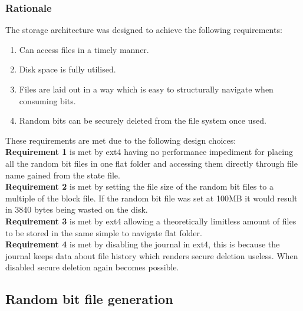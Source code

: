 \documentclass{paper}
\begin{document}
				\subsubsection{Rationale}
					The storage architecture was designed to achieve the following requirements: \vspace{-0.75em}
					\begin{enumerate}
					\setlength\itemsep{-0.3em}
					\item 	Can access files in a timely manner.
					\item 	Disk space is fully utilised.
					\item 	Files are laid out in a way which is easy to structurally navigate when consuming bits.
					\item 	Random bits can be securely deleted from the file system once used.
					\end{enumerate}
					These requirements are met due to the following design choices:\\
					\textbf{Requirement 1} is met by ext4 having no performance impediment for placing all the random bit files in one flat folder and accessing them directly through file name gained from the state file.\\
					\textbf{Requirement 2} is met by setting the file size of the random bit files to a multiple of the block file. If the random bit file was set at 100MB it would result in 3840 bytes being wasted on the disk.\\
					\textbf{Requirement 3} is met by ext4 allowing a theoretically limitless amount of files to be stored in the same simple to navigate flat folder.\\
					\textbf{Requirement 4} is met by disabling the journal in ext4, this is because the journal keeps data about file history which renders secure deletion useless. When disabled secure deletion again becomes possible.
			\subsection{Random bit file generation}
\end{document}
